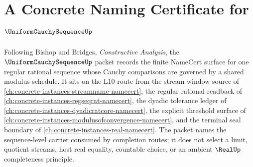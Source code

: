 \chapter{A Concrete Naming Certificate for $\UniformCauchySequenceUp$}
\label{ch:concrete-instances-uniform-cauchy-sequence-namecert}

Following Bishop and Bridges, \emph{Constructive Analysis}, the $\UniformCauchySequenceUp$ packet records the finite NameCert surface for one regular rational sequence whose Cauchy comparisons are governed by a shared modulus schedule. It sits on the L10 route from the stream-window source of \autoref{ch:concrete-instances-streamname-namecert}, the regular rational readback of \autoref{ch:concrete-instances-regseqrat-namecert}, the dyadic tolerance ledger of \autoref{ch:concrete-instances-dyadicratcore-namecert}, the explicit threshold surface of \autoref{ch:concrete-instances-modulusofconvergence-namecert}, and the terminal seal boundary of \autoref{ch:concrete-instances-real-namecert}. The packet names the sequence-level carrier consumed by completion routes; it does not select a limit, quotient streams, host real equality, countable choice, or an ambient $\RealUp$ completeness principle.

